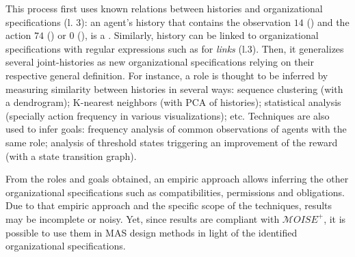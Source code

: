 \documentclass[runningheads]{llncs}
\newcounter{relation}
\begin{document}
This process first uses known relations between histories and organizational specifications (l. 3): an agent's history that contains the observation $14$ () and the action $74$ () or $0$ (), is a . Similarly, history can be linked to organizational specifications with regular expressions such as for \emph{links} (l.3).
Then, it generalizes several joint-histories as new organizational specifications relying on their respective general definition.
%
For instance, a role is thought to be inferred by measuring similarity between histories in several ways: sequence clustering (with a dendrogram); K-nearest neighbors (with PCA of histories); statistical analysis (specially action frequency in various visualizations); etc.
%
Techniques are also used to infer goals: frequency analysis of common observations of agents with the same role; analysis of threshold states triggering an improvement of the reward (with a state transition graph).

From the roles and goals obtained, an empiric approach allows inferring the other organizational specifications such as compatibilities, permissions and obligations.
Due to that empiric approach and the specific scope of the techniques, results may be incomplete or noisy. Yet, since results are compliant with $\mathcal{M}OISE^+$, it is possible to use them in MAS design methods in light of the identified organizational specifications.





\end{document}
